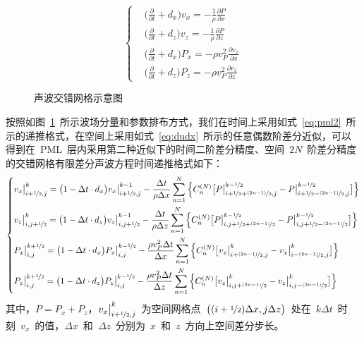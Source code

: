 \documentclass[UTF8]{ctexart}
\begin{document}
\begin{equation}
\left\{ \begin{aligned}
& \big(\frac{\partial}{\partial t}+d_x\big)v_x=-\frac{1}{\rho}\frac{\partial P}{\partial x} \\
& \big(\frac{\partial}{\partial t}+d_z\big)v_z=-\frac{1}{\rho}\frac{\partial P}{\partial z} \\
& \big(\frac{\partial}{\partial t}+d_x\big)P_x=-\rho v_P^2\frac{\partial v_x}{\partial x} \\
& \big(\frac{\partial}{\partial t}+d_z\big)P_z=-\rho v_P^2\frac{\partial v_z}{\partial z}
\end{aligned} \right.
\end{equation}\par
\begin{figure}[t]
  \centering
  
  \caption{声波交错网格示意图}\label{fig:asg}
\end{figure}
按照如图~\ref{fig:asg}~所示波场分量和参数排布方式，我们在时间上采用如式~\eqref{eq:pml2}~所示的递推格式，在空间上采用如式~\eqref{eq:dudx}~所示的任意偶数阶差分近似，可以得到在~PML~层内采用第二种近似下的时间二阶差分精度、空间~$2N$~阶差分精度的交错网格有限差分声波方程时间递推格式如下：
\begin{equation}
\left\{ \begin{aligned}
& v_x\big|_{i+\nicefrac{1}{2},j}^k=\big(1-\Delta t\cdot d_x\big) v_x\big|_{i+\nicefrac{1}{2},j}^{k-1}-\frac{\Delta t}{\rho\Delta x}\sum\limits_{n=1}^N\Big\{C_n^{(N)}\big[P\big|_{i+\nicefrac{1}{2}+\nicefrac{(2n-1)}{2},j}^{k-\nicefrac{1}{2}}-P\big|_{i+\nicefrac{1}{2}-\nicefrac{(2n-1)}{2},j}^{k-\nicefrac{1}{2}}\big]\Big\} \\
& v_z\big|_{i,j+\nicefrac{1}{2}}^k=\big(1-\Delta t\cdot d_z\big) v_z\big|_{i,j+\nicefrac{1}{2}}^{k-1}-\frac{\Delta t}{\rho\Delta z}\sum\limits_{n=1}^N\Big\{C_n^{(N)}\big[P\big|_{i,j+\nicefrac{1}{2}+\nicefrac{(2n-1)}{2}}^{k-\nicefrac{1}{2}}-P\big|_{i,j+\nicefrac{1}{2}-\nicefrac{(2n-1)}{2}}^{k-\nicefrac{1}{2}}\big]\Big\} \\
& P_x\big|_{i,j}^{k+\nicefrac{1}{2}}=\big(1-\Delta t\cdot d_x\big) P_x\big|_{i,j}^{k-\nicefrac{1}{2}}-\frac{\rho v_P^2\Delta t}{\Delta x}\sum\limits_{n=1}^N\Big\{C_n^{(N)}\big[v_x\big|_{i+\nicefrac{(2n-1)}{2},j}^k-v_x\big|_{i-\nicefrac{(2n-1)}{2},j}^k\big]\Big\} \\
& P_z\big|_{i,j}^{k+\nicefrac{1}{2}}=\big(1-\Delta t\cdot d_z\big) P_z\big|_{i,j}^{k-\nicefrac{1}{2}}-\frac{\rho v_P^2\Delta t}{\Delta z}\sum\limits_{n=1}^N\Big\{C_n^{(N)}\big[v_z\big|_{i,j+\nicefrac{(2n-1)}{2}}^k-v_z\big|_{i,j-\nicefrac{(2n-1)}{2}}^k\big]\Big\}
\end{aligned} \right.
\end{equation}
其中，$P=P_x+P_z$，$v_x\big|_{i+\nicefrac{1}{2},j}^k$~为空间网格点~$\big((i+\nicefrac{1}{2})\Delta x,j\Delta z\big)$~处在~$k\Delta t$~时刻~$v_x$~的值，$\Delta x$~和~$\Delta z$~分别为~$x$~和~$z$~方向上空间差分步长。\par
\end{document}
